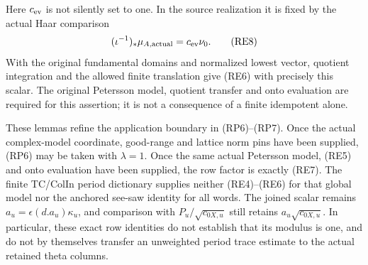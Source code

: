 Here \(c_{\rm ev}\) is not silently set to one.  In the
source realization it is fixed by the actual Haar comparison
\[
       (\iota^{-1})_*\mu_{A,\mathrm{actual}}
                   =c_{\rm ev}\nu_0 .                 \tag{RE8}
\]
With the original fundamental domains and normalized lowest
vector, quotient integration and the allowed finite translation
give (RE6) with precisely this scalar.  The original
Petersson model, quotient transfer and onto evaluation are
required for this assertion; it is not a consequence of a
finite idempotent alone.

These lemmas refine the application boundary in (RP6)--(RP7).
Once the actual complex-model coordinate, good-range and lattice
norm pins have been supplied, (RP6) may be taken with \(\lambda=1\).
Once the same actual Petersson model, (RE5) and onto evaluation
have been supplied, the row factor is exactly (RE7).
The finite TC/ColIn period dictionary supplies neither (RE4)--(RE6)
for that global model nor the anchored see-saw identity for all
words.  The joined scalar remains
\(a_u=\epsilon(d.a_u)\kappa_u\), and comparison with
\(P_u/\sqrt{c_{0X,u}}\) still retains
\(a_u\sqrt{c_{0X,u}}\).  In particular, these exact row
identities do not establish that its modulus is one, and do not
by themselves transfer an unweighted period trace estimate to
the actual retained theta columns.
